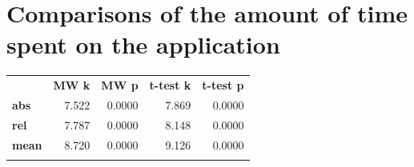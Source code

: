 \section{Comparisons of the amount of time spent on the application}

\begin{longtable}[c]{@{}lrrrr@{}}
\toprule\addlinespace
& \textbf{MW k} & \textbf{MW p} &
\textbf{t-test k} & \textbf{t-test p}
\\\addlinespace
\midrule
\textbf{abs} & 7.522 & 0.0000 & 7.869 & 0.0000
\\\addlinespace
\textbf{rel} & 7.787 & 0.0000 & 8.148 & 0.0000
\\\addlinespace
\textbf{mean} & 8.720 & 0.0000 & 9.126 & 0.0000
\\\addlinespace
\bottomrule
    \label{tab:time_comp}
\end{longtable}
